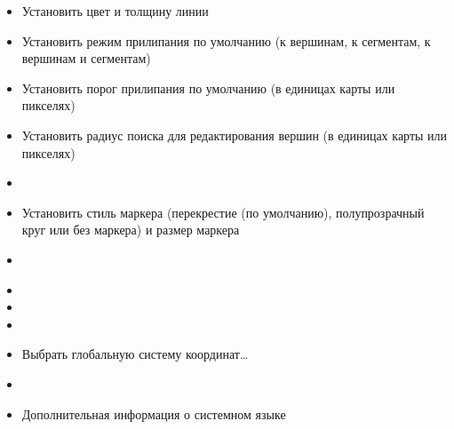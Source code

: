 \begin{itemize}
\item Установить цвет и толщину линии
\item Установить режим прилипания по умолчанию (к вершинам, к сегментам,
к вершинам и сегментам)
\item Установить порог прилипания по умолчанию (в единицах карты или
пикселях)
\item Установить радиус поиска для редактирования вершин (в единицах
карты или пикселях)
\item {}
\item Установить стиль маркера (перекрестие (по умолчанию), полупрозрачный
круг или без маркера) и размер маркера
\item {}
\end{itemize}


\begin{itemize}
\item {}
\item {}
\item {}
\item Выбрать глобальную систему координат\ldots
\end{itemize}


\begin{itemize}
\item {}
\item Дополнительная информация о системном языке
\end{itemize}


